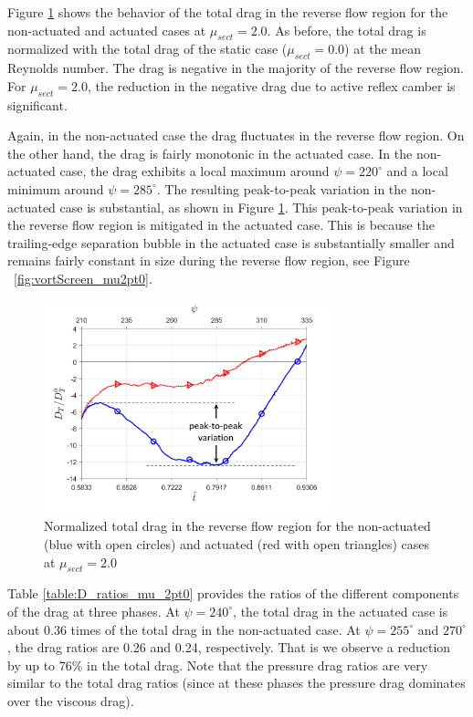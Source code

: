 Figure \ref{fig:total_drag_zoomed_mu_2pt0} shows the behavior of the total drag in the reverse flow region for the non-actuated and actuated cases at $\mu_{sect}=2.0$. As before, the total drag is normalized with the total drag of the static case ($\mu_{sect}=0.0$) at the mean Reynolds number. 
The drag is negative in the majority of the reverse flow region.
For $\mu_{sect}=2.0$, the reduction in the negative drag due to active reflex camber is significant.

Again, in the non-actuated case the drag fluctuates in the reverse flow region.
On the other hand, the drag is fairly monotonic in the actuated case.
In the non-actuated case, the drag exhibits a local maximum around $\psi=220^\circ$ and a local minimum around $\psi=285^\circ$.
The resulting peak-to-peak variation in the non-actuated case is substantial, as shown in Figure \ref{fig:total_drag_zoomed_mu_2pt0}.
This peak-to-peak variation in the reverse flow region is mitigated in the actuated case.
This is because the trailing-edge separation bubble in the actuated case is substantially smaller and remains fairly constant in size during the reverse flow region, see Figure ~\ref{fig:vortScreen_mu2pt0}.

\begin{figure}[H]
	
	\centering
	\includegraphics[width=0.75\textwidth]{figures/Zoomed_Drag_tot_NACA0012_Re1m_aoa10_3.png}
	\caption{Normalized total drag in the reverse flow region for the non-actuated (blue with open circles) and actuated (red with open triangles) cases at $\mu_{sect}=2.0$}
	\label{fig:total_drag_zoomed_mu_2pt0}
\end{figure}

Table \ref{table:D_ratios_mu_2pt0} provides the ratios of the different components of the drag at three phases. At $\psi=240^\circ$, the total drag in the actuated case is about 0.36 times of the total drag in the non-actuated case. At $\psi=255^\circ$ and $270^\circ$, the drag ratios are 0.26 and 0.24, respectively. That is we observe a reduction by up to 76\% in the total drag.
Note that the pressure drag ratios are very similar to the total drag ratios (since at these phases the pressure drag dominates over the viscous drag).

